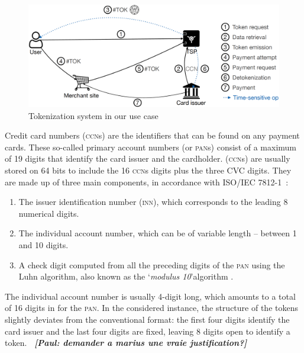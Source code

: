 \documentclass{llncs}
\newcommand{\ph}[1]{\emph{\bf \color{red}~[Paul: #1]}}
\begin{document}
\begin{figure}
    \centering
    \includegraphics[width=\textwidth]{Tex/Figures/use_case.png}
    \caption{Tokenization system in our use case}
    \label{fig:tokenization-system}
\end{figure}

Credit card numbers (\textsc{ccn}s) are the identifiers that can be found on any payment cards.  These so-called primary account numbers (or \textsc{pan}s) consist of a maximum of 19 digits that identify the card issuer and the cardholder. (\textsc{ccn}s) are usually stored on 64 bits to include the 16 \textsc{ccn}s digits plus the three \textsc{CVC} digits.
They are made up of three main components, in accordance with ISO/IEC 7812-1~\cite{ISO78121}:
\begin{enumerate}
    \item The issuer identification number (\textsc{inn}), which corresponds to the leading 8 numerical digits. %
    \item The individual account number, which can be of variable length -- between 1 and 10 digits.
    \item A check digit computed from all the preceding digits of the \textsc{pan} using the Luhn algorithm, also known as the \lq\textit{modulus 10}\rq algorithm \cite{Luhn1960}.
\end{enumerate}

The individual account number is usually 4-digit long, which amounts to a total of 16 digits in for the \textsc{pan}. In the considered instance, the structure of the tokens slightly deviates from the conventional format: the first four digits identify the card issuer and the last four digits are fixed, leaving 8 digits open to identify a token. \ph{demander a marius une vraie justification?}
\end{document}
